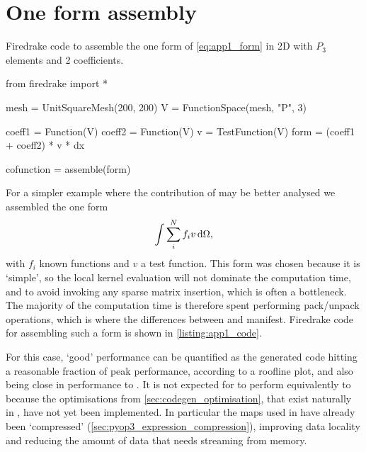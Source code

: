 \documentclass[thesis]{subfiles}
\begin{document}
\section{One form assembly}
\label{sec:demo_apps_one_form_assembly}

\begin{listing}
  \centering
  \caption{
    Firedrake code to assemble the one form of \cref{eq:app1_form} in 2D with $P_3$ elements and 2 coefficients.
  }
  \begin{minipage}{.9\textwidth}
    \begin{pyalg2}
      from firedrake import *

      mesh = UnitSquareMesh(200, 200)
      V = FunctionSpace(mesh, "P", 3)

      coeff1 = Function(V)
      coeff2 = Function(V)
      v = TestFunction(V)
      form = (coeff1 + coeff2) * v * dx

      cofunction = assemble(form)
    \end{pyalg2}
  \end{minipage}
  \label{listing:app1_code}
\end{listing}

For a simpler example where the contribution of  may be better analysed we assembled the one form
\begin{equation}
  \label{eq:app1_form}
  \int \sum_i^N f_i v\, \textnormal{d}\Omega,
\end{equation}
with $f_i$ known functions and $v$ a test function.
This form was chosen because it is `simple', so the local kernel evaluation will not dominate the computation time, and to avoid invoking any sparse matrix insertion, which is often a bottleneck.
The majority of the computation time is therefore spent performing pack/unpack operations, which is where the differences between  and  manifest.
Firedrake code for assembling such a form is shown in \cref{listing:app1_code}.

For this case, `good' performance can be quantified as the generated code hitting a reasonable fraction of peak performance, according to a roofline plot, and also being close in performance to .
It is not expected for  to perform equivalently to  because the optimisations from \cref{sec:codegen_optimisation}, that exist naturally in , have not yet been implemented.
In particular the maps used in  have already been `compressed' (\cref{sec:pyop3_expression_compression}), improving data locality and reducing the amount of data that needs streaming from memory.
\end{document}
